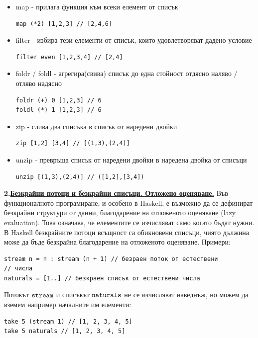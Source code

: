 \documentclass{article}
\newcommand{\cppplain}[1]{\textcolor{black}{\texttt{#1}}}
\begin{document}
\begin{itemize}
    \item map - прилага функция към всеки елемент от списък
\begin{lstlisting}[style=cpp]
map (*2) [1,2,3] // [2,4,6]
\end{lstlisting}
    \item filter - избира тези елементи от списък, които удовлетворяват дадено условие
\begin{lstlisting}[style=cpp]
filter even [1,2,3,4] // [2,4]
\end{lstlisting}
    \item foldr / foldl - агрегира(свива) списък до една стойност отдясно наляво / отляво надясно
\begin{lstlisting}[style=cpp]
foldr (+) 0 [1,2,3] // 6
foldl (*) 1 [1,2,3] // 6
\end{lstlisting}
    \item zip - слива два списъка в списък от наредени двойки
\begin{lstlisting}[style=cpp]
zip [1,2] [3,4] // [(1,3),(2,4)]
\end{lstlisting}
    \item unzip - превръща списък от наредени двойки в наредена двойка от списъци
\begin{lstlisting}[style=cpp]
unzip [(1,3),(2,4)] // ([1,2],[3,4])
\end{lstlisting}
\end{itemize}
\textbf{2.\underline{Безкрайни потоци и безкрайни списъци. Отложено оценяване.}} \newline\newline
Във функционалното програмиране, и особено в Haskell, е възможно да се дефинират безкрайни структури от данни, благодарение на отложеното оценяване
(lazy evaluation). Това означава, че елементите се изчисляват само когато бъдат нужни. В Haskell безкрайните потоци всъщност са обикновени списъци,
чиято дължина може да бъде безкрайна благодарение на отложеното оценяване. \newline\newline
Примери:
\begin{lstlisting}[style=cpp]
stream n = n : stream (n + 1) // безраен поток от естествени
// числа
naturals = [1..] // безкраен списък от естествени числа
\end{lstlisting}
Потокът $\cppplain{stream}$ и списъкът $\cppplain{naturals}$ не се изчисляват наведнъж, но можем да вземем например началните им елементи:
\begin{lstlisting}[style=cpp]
take 5 (stream 1) // [1, 2, 3, 4, 5]
take 5 naturals // [1, 2, 3, 4, 5]
\end{lstlisting}
\end{document}
